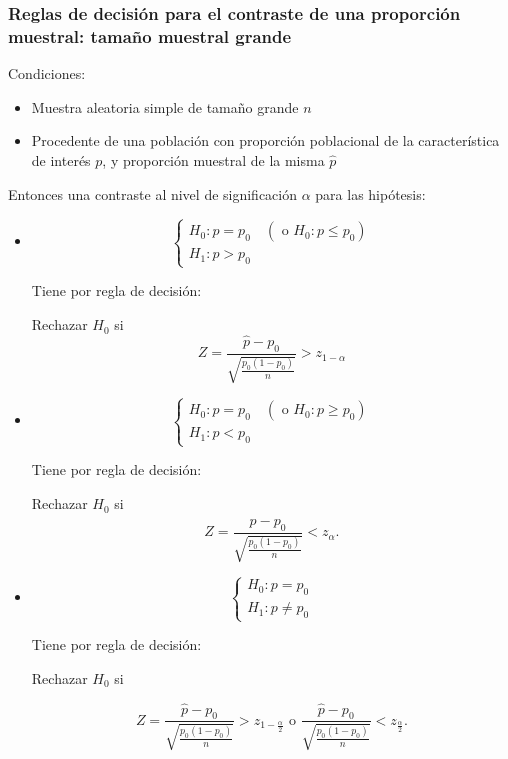 \begin{frame}
\frametitle{Reglas de decisión para el contraste de una proporción muestral: tamaño muestral grande}
Condiciones:
\begin{itemize}
\item Muestra aleatoria simple de tamaño grande $n$
\item Procedente de una población con proporción poblacional de la característica de interés $p$, y proporción muestral de la misma $\hat{p}$
\end{itemize}

     Entonces una contraste al nivel de significación $\alpha$ para las
    hipótesis:
\begin{itemize}
\item $$\left\{\begin{array}{l}
    H_{0}:p=p_{0} \quad (\mbox{ o } H_{0}:p\leq p_{0})\\
    H_{1}:p>p_{0}
    \end{array}\right.$$


    Tiene por regla de decisión:

    Rechazar $H_{0}$ si
    $$Z=
    \frac{\hat{p}-p_{0}}{
    {\sqrt{\frac{p_{0}(1-p_{0})}{n}}}}>z_{1-\alpha}$$
\end{itemize}
\end{frame}

\begin{frame}
\begin{itemize}
\item $$\left\{\begin{array}{l}
    H_{0}:p=p_{0} \quad (\mbox{ o } H_{0}:p\geq p_{0})\\
    H_{1}:p<p_{0}
    \end{array}\right.$$

    Tiene por regla de decisión:

    Rechazar $H_{0}$ si
    $$Z=
    \frac{\hat{p}-p_{0}}{
    {\sqrt{\frac{p_{0}(1-p_{0})}{n}}}}<z_{\alpha}.$$

\item $$\left\{\begin{array}{l}
    H_{0}:p=p_{0} \\
    H_{1}:p\not=p_{0}
    \end{array}\right.$$

    Tiene por regla de decisión:

    Rechazar $H_{0}$ si

    $$Z=
\frac{\hat{p}-p_{0}}{
    {\sqrt{\frac{p_{0}(1-p_{0})}{n}}}}>z_{1-\frac{\alpha}{2}} \mbox{ o } \frac{\hat{p}-p_{0}}{
    {\sqrt{\frac{p_{0}(1-p_{0})}{n}}}}<z_{\frac{\alpha}{2}}.$$
\end{itemize}
\end{frame}

